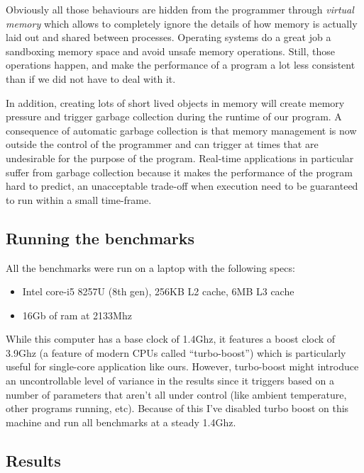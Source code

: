 \documentclass[
]{article}
\providecommand{\tightlist}{%
  \setlength{\itemsep}{0pt}\setlength{\parskip}{0pt}}
\begin{document}
Obviously all those behaviours are hidden from the programmer through
\emph{virtual memory} which allows to completely ignore the details of
how memory is actually laid out and shared between processes. Operating
systems do a great job a sandboxing memory space and avoid unsafe memory
operations. Still, those operations happen, and make the performance of
a program a lot less consistent than if we did not have to deal with it.

In addition, creating lots of short lived objects in memory will create
memory pressure and trigger garbage collection during the runtime of our
program. A consequence of automatic garbage collection is that memory
management is now outside the control of the programmer and can trigger
at times that are undesirable for the purpose of the program. Real-time
applications in particular suffer from garbage collection because it
makes the performance of the program hard to predict, an unacceptable
trade-off when execution need to be guaranteed to run within a small
time-frame.

\hypertarget{running-the-benchmarks}{%
\subsection{Running the benchmarks}\label{running-the-benchmarks}}

All the benchmarks were run on a laptop with the following specs:

\begin{itemize}
\tightlist
\item
  Intel core-i5 8257U (8th gen), 256KB L2 cache, 6MB L3 cache
\item
  16Gb of ram at 2133Mhz
\end{itemize}

While this computer has a base clock of 1.4Ghz, it features a boost
clock of 3.9Ghz (a feature of modern CPUs called ``turbo-boost'') which
is particularly useful for single-core application like ours. However,
turbo-boost might introduce an uncontrollable level of variance in the
results since it triggers based on a number of parameters that aren't
all under control (like ambient temperature, other programs running,
etc). Because of this I've disabled turbo boost on this machine and run
all benchmarks at a steady 1.4Ghz.

\hypertarget{results}{%
\subsection{Results}\label{results}}
\end{document}
